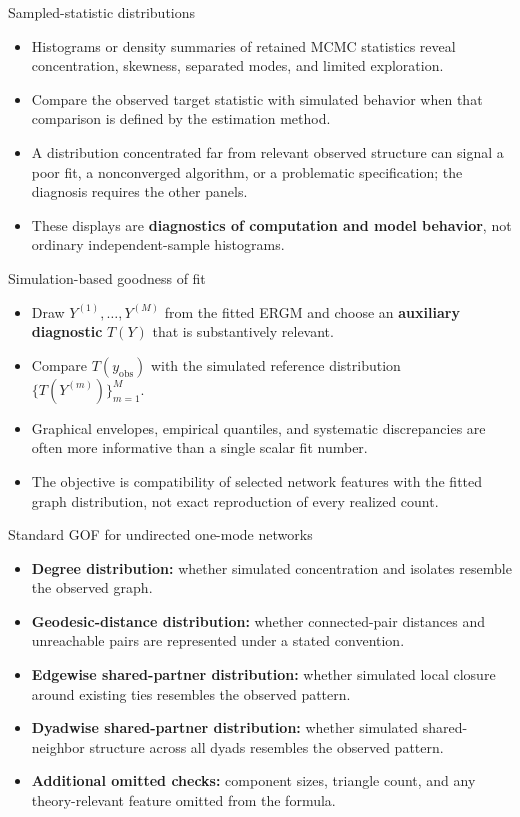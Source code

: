 \documentclass[aspectratio=169,11pt]{beamer}
\newcommand{\term}[1]{\textbf{\color{nupurple}#1}}
\begin{document}
\begin{frame}{Sampled-statistic distributions}
\begin{itemize}
\item Histograms or density summaries of retained MCMC statistics reveal concentration, skewness, separated modes, and limited exploration.
\item Compare the observed target statistic with simulated behavior when that comparison is defined by the estimation method.
\item A distribution concentrated far from relevant observed structure can signal a poor fit, a nonconverged algorithm, or a problematic specification; the diagnosis requires the other panels.
\item These displays are \term{diagnostics of computation and model behavior}, not ordinary independent-sample histograms.
\end{itemize}
\end{frame}

\begin{frame}{Simulation-based goodness of fit}
\begin{itemize}
\item Draw $Y^{(1)},\ldots,Y^{(M)}$ from the fitted ERGM and choose an \term{auxiliary diagnostic} $T(Y)$ that is substantively relevant.
\item Compare $T(y_{\mathrm{obs}})$ with the simulated reference distribution $\{T(Y^{(m)})\}_{m=1}^M$.
\item Graphical envelopes, empirical quantiles, and systematic discrepancies are often more informative than a single scalar fit number.
\item The objective is compatibility of selected network features with the fitted graph distribution, not exact reproduction of every realized count.
\end{itemize}
\end{frame}

\begin{frame}{Standard GOF for undirected one-mode networks}
\begin{itemize}
\item \term{Degree distribution:} whether simulated concentration and isolates resemble the observed graph.
\item \term{Geodesic-distance distribution:} whether connected-pair distances and unreachable pairs are represented under a stated convention.
\item \term{Edgewise shared-partner distribution:} whether simulated local closure around existing ties resembles the observed pattern.
\item \term{Dyadwise shared-partner distribution:} whether simulated shared-neighbor structure across all dyads resembles the observed pattern.
\item \term{Additional omitted checks:} component sizes, triangle count, and any theory-relevant feature omitted from the formula.
\end{itemize}
\end{frame}
\end{document}
